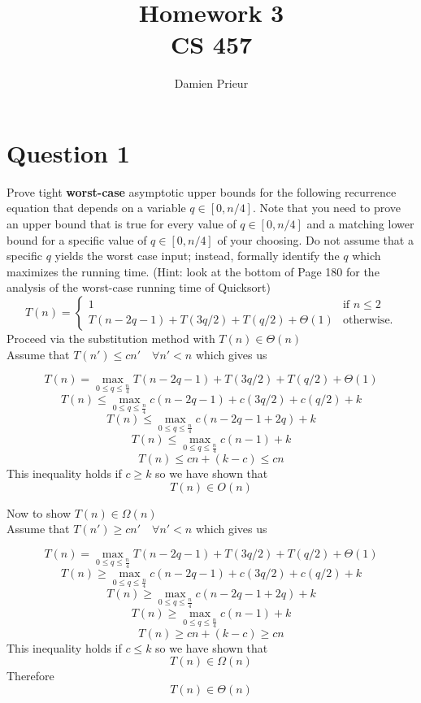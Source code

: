 \documentclass{article}
\author{Damien Prieur}
\title{Homework 3 \\ CS 457}
\date{}
\begin{document}
\maketitle

\section*{Question 1}
Prove tight \textbf{worst-case} asymptotic upper bounds for the following recurrence equation
that depends on a variable $q\in [0, n/4]$. Note that you need to prove an upper bound that is true for every
value of $q\in [0, n/4]$ and a matching lower bound for a specific value of $q\in [0, n/4]$ of your choosing.
Do not assume that a specific $q$ yields the worst case input; instead, formally identify the $q$ which maximizes
the running time. (Hint: look at the bottom of Page 180 for the analysis of the worst-case running time of Quicksort)
\begin{equation*}
T(n) =
\begin{cases}
1 &\text{if $n\leq 2$}\\
T(n-2q-1)+T(3q/2)+T(q/2)+\Theta(1) &\text{otherwise.}
\end{cases}
\end{equation*}
Proceed via the substitution method with $T(n) \in \Theta(n)$ \\
Assume that $T(n') \leq cn' \quad \forall n' < n$ which gives us

$$T(n) = \max_{0\leq q \leq \frac{n}{4}} T(n-2q-1)+T(3q/2)+T(q/2)+\Theta(1)$$
$$T(n) \leq \max_{0\leq q \leq \frac{n}{4}} c(n-2q-1)+c(3q/2)+c(q/2)+k$$
$$T(n) \leq \max_{0\leq q \leq \frac{n}{4}} c(n-2q-1+2q)+k$$
$$T(n) \leq \max_{0\leq q \leq \frac{n}{4}} c(n-1)+k$$
$$T(n) \leq cn+(k-c) \leq cn$$
This inequality holds if $c \geq k$ so we have shown that
$$T(n) \in O(n)$$

Now to show $T(n) \in \Omega(n)$ \\
Assume that $T(n') \geq cn' \quad \forall n' < n$ which gives us

$$T(n) = \max_{0\leq q \leq \frac{n}{4}} T(n-2q-1)+T(3q/2)+T(q/2)+\Theta(1)$$
$$T(n) \geq \max_{0\leq q \leq \frac{n}{4}} c(n-2q-1)+c(3q/2)+c(q/2)+k$$
$$T(n) \geq \max_{0\leq q \leq \frac{n}{4}} c(n-2q-1+2q)+k$$
$$T(n) \geq \max_{0\leq q \leq \frac{n}{4}} c(n-1)+k$$
$$T(n) \geq cn+(k-c) \geq cn$$
This inequality holds if $c \leq k$ so we have shown that
$$T(n) \in \Omega(n)$$
Therefore
$$T(n) \in \Theta(n)$$
\end{document}
